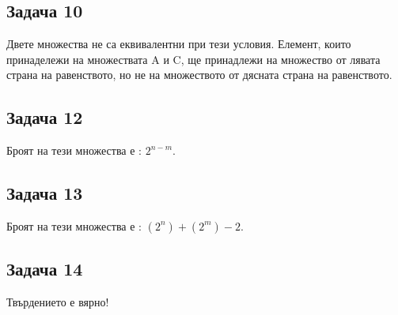 \documentclass[]{article}
\begin{document}
	
	
	\subsection*{Задача 10}
	
	Двете множества $\textbf{не са}$ еквивалентни при тези условия.
	Елемент, които принадележи на множествата A и C, ще принадлежи на множество от лявата страна на равенството, но не на множеството от дясната страна на равенството.
	
	
	\subsection*{Задача 12}
	
	Броят на тези множества е  : $2^{n-m}$.
	
	\subsection*{Задача 13}
	
	Броят на тези множества е : $(2^n)+ (2^m) - 2$.
	
	\subsection*{Задача 14}
	
	Твърдението е вярно!
	
	
\end{document}
